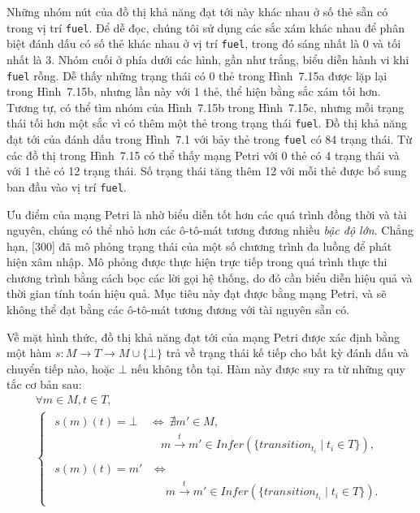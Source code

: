 Những nhóm nút của đồ thị khả năng đạt tới này khác nhau ở số thẻ sẵn có trong vị trí \texttt{fuel}. Để dễ đọc, chúng tôi sử dụng các sắc xám khác nhau để phân biệt đánh dấu có số thẻ khác nhau ở vị trí \texttt{fuel}, trong đó sáng nhất là 0 và tối nhất là 3. Nhóm cuối ở phía dưới các hình, gần như trắng, biểu diễn hành vi khi \texttt{fuel} rỗng. Dễ thấy những trạng thái có 0 thẻ trong Hình~7.15a được lặp lại trong Hình~7.15b, nhưng lần này với 1 thẻ, thể hiện bằng sắc xám tối hơn. Tương tự, có thể tìm nhóm của Hình~7.15b trong Hình~7.15c, nhưng mỗi trạng thái tối hơn một sắc vì có thêm một thẻ trong trạng thái \texttt{fuel}. Đồ thị khả năng đạt tới của đánh dấu trong Hình~7.1 với bảy thẻ trong \texttt{fuel} có 84 trạng thái. Từ các đồ thị trong Hình~7.15 có thể thấy mạng Petri với 0 thẻ có 4 trạng thái
và với 1 thẻ có 12 trạng thái. Số trạng thái tăng thêm 12 với mỗi thẻ được bổ sung ban đầu vào vị trí \texttt{fuel}.

Ưu điểm của mạng Petri là nhờ biểu diễn tốt hơn các quá trình đồng thời và tài nguyên, chúng có thể nhỏ hơn các ô-tô-mát tương đương nhiều \emph{bậc độ lớn}. Chẳng hạn, [300] đã mô phỏng trạng thái của một số chương trình đa luồng để phát hiện xâm nhập. Mô phỏng được thực hiện trực tiếp trong quá trình thực thi chương trình bằng cách bọc các lời gọi hệ thống, do đó cần biểu diễn hiệu quả và thời gian tính toán hiệu quả. Mục tiêu này đạt được bằng mạng Petri, và sẽ không thể đạt bằng các ô-tô-mát tương đương với tài nguyên sẵn có.

Về mặt hình thức, đồ thị khả năng đạt tới của mạng Petri được xác định bằng một hàm $s:M\to T\to M\cup\{\bot\}$ trả về trạng thái kế tiếp cho bất kỳ đánh dấu và chuyển tiếp nào, hoặc $\bot$ nếu không tồn tại. Hàm này được suy ra từ những quy tắc cơ bản sau:
\begin{equation}
\begin{gathered}
\forall m\in M,t\in T,\\
\begin{cases}
\begin{aligned}
s(m)(t)=\bot\ &\Longleftrightarrow\ \nexists m'\in M,\\
&\quad m\xrightarrow{t}m'\in Infer(\{transition_{t_i}\mid t_i\in T\}),
\end{aligned}\\[1ex]
\begin{aligned}
s(m)(t)=m'\ &\Longleftrightarrow\\
&\quad m\xrightarrow{t}m'\in Infer(\{transition_{t_i}\mid t_i\in T\}).
\end{aligned}
\end{cases}
\end{gathered}\tag{7.5}
\end{equation}

